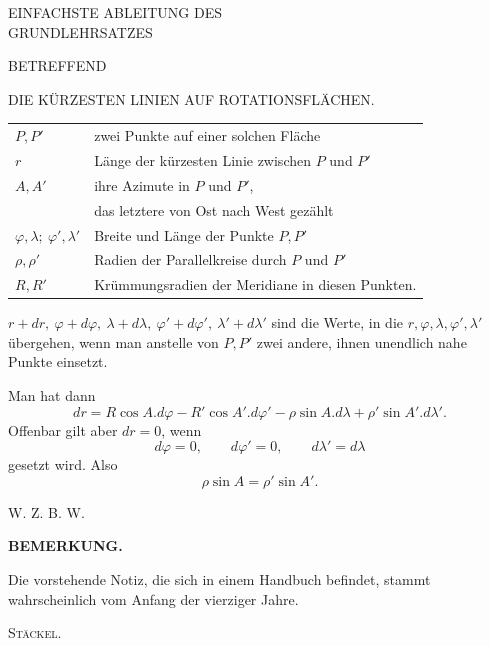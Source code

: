 \clearpage
{}
\begin{center}\large EINFACHSTE ABLEITUNG DES\\GRUNDLEHRSATZES\end{center}
\begin{center}BETREFFEND\end{center}
\begin{center}\large DIE KÜRZESTEN LINIEN AUF ROTATIONSFLÄCHEN.\end{center}
\begin{center}\begin{tabular}{lp{.73\linewidth}}
$P,P'$ & zwei Punkte auf einer solchen Fläche\\
$r$ & Länge der kürzesten Linie zwischen $P$ und $P'$\\
$A,A'$ & ihre Azimute in $P$ und $P'$,\\
& das letztere von Ost nach West gezählt\\
$\varphi,\lambda;\ \varphi',\lambda'$ & Breite und Länge der Punkte $P,P'$\\
$\rho,\rho'$ & Radien der Parallelkreise durch $P$ und $P'$\\
$R,R'$ & Krümmungsradien der Meridiane in diesen Punkten.
\end{tabular}\end{center}
\noindent $r+dr,\ \varphi+d\varphi,\ \lambda+d\lambda,\ \varphi'+d\varphi',\ \lambda'+d\lambda'$ sind die Werte, in die $r,\varphi,\lambda,\varphi',\lambda'$ übergehen, wenn man anstelle von $P,P'$ zwei andere, ihnen unendlich nahe Punkte einsetzt.

Man hat dann
\[
dr=R\cos A.d\varphi-R'\cos A'.d\varphi'-\rho\sin A.d\lambda+\rho'\sin A'.d\lambda'.
\]
\noindent Offenbar gilt aber $dr=0$, wenn
\[
d\varphi=0,\qquad d\varphi'=0,\qquad d\lambda'=d\lambda
\]
\noindent gesetzt wird. Also
\[
\rho\sin A=\rho'\sin A'.
\]
\begin{flushright}W. Z. B. W.\end{flushright}
\begin{center}\textbf{BEMERKUNG.}\end{center}
\noindent\hspace*{1.2em}Die vorstehende Notiz, die sich in einem Handbuch befindet, stammt wahrscheinlich vom Anfang der vierziger Jahre.
\begin{flushright}\textsc{Stäckel}.\end{flushright}

